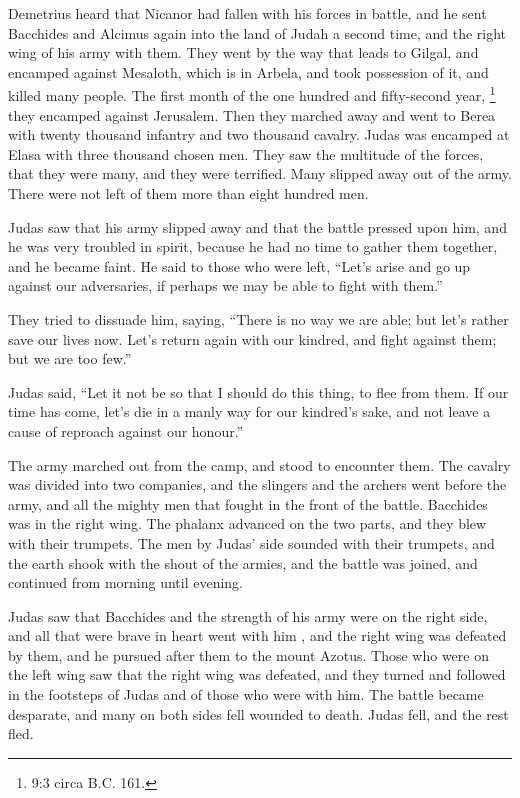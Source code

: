  Demetrius heard that Nicanor had fallen with his forces in
battle, and he sent Bacchides and Alcimus again into the land of Judah a
second time, and the right wing of his army with them.  They
went by the way that leads to Gilgal, and encamped against Mesaloth,
which is in Arbela, and took possession of it, and killed many people.
 The first month of the one hundred and fifty-second year,
\footnote{9:3 circa B.C. 161.} they encamped against Jerusalem.
 Then they marched away and went to Berea with twenty
thousand infantry and two thousand cavalry.  Judas was
encamped at Elasa with three thousand chosen men.  They saw
the multitude of the forces, that they were many, and they were
terrified. Many slipped away out of the army. There were not left of
them more than eight hundred men.

 Judas saw that his army slipped away and that the battle
pressed upon him, and he was very troubled in spirit, because he had no
time to gather them together, and he became faint.  He said
to those who were left, ``Let's arise and go up against our adversaries,
if perhaps we may be able to fight with them.''

 They tried to dissuade him, saying, ``There is no way we
are able; but let's rather save our lives now. Let's return again with
our kindred, and fight against them; but we are too few.''

 Judas said, ``Let it not be so that I should do this
thing, to flee from them. If our time has come, let's die in a manly way
for our kindred's sake, and not leave a cause of reproach against our
honour.''

 The army marched out from the camp, and stood to encounter
them. The cavalry was divided into two companies, and the slingers and
the archers went before the army, and all the mighty men that fought in
the front of the battle.  Bacchides was in the right wing.
The phalanx advanced on the two parts, and they blew with their
trumpets.  The men by Judas' side sounded with their
trumpets, and the earth shook with the shout of the armies, and the
battle was joined, and continued from morning until evening.

 Judas saw that Bacchides and the strength of his army were
on the right side, and all that were brave in heart went with him ,
 and the right wing was defeated by them, and he pursued
after them to the mount Azotus.  Those who were on the left
wing saw that the right wing was defeated, and they turned and followed
in the footsteps of Judas and of those who were with him. 
The battle became desparate, and many on both sides fell wounded to
death.  Judas fell, and the rest fled.

